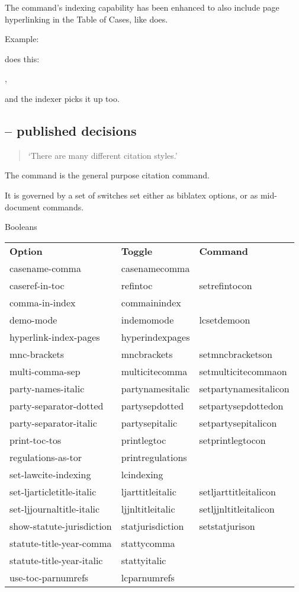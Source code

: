 The  command's indexing capability has been enhanced to also include page hyperlinking in the Table of Cases, like  does.

Example:

\bigskip

\setpartysepitalicoff
{} does this: 

, 

and the indexer picks it up too.

\subsection{ -- published decisions}
\begin{quotation}
`There are many different citation styles.' 
\medskip

\end{quotation}

The  command is the general purpose citation command.

It is governed by a set of switches set either as biblatex options, or as mid-document commands.
\bigskip

Booleans

\begin{tabular}{lll}
\bfseries Option & \bfseries Toggle & \bfseries Command \\ 
casename-comma & casenamecomma &  \\ 
caseref-in-toc & refintoc & setrefintocon \\ 
comma-in-index & commainindex &  \\ 
demo-mode & indemomode & lcsetdemoon \\ 
hyperlink-index-pages & hyperindexpages &  \\ 
mnc-brackets & mncbrackets & setmncbracketson \\ 
multi-comma-sep & multicitecomma & setmulticitecommaon \\ 
party-names-italic & partynamesitalic & setpartynamesitalicon \\ 
party-separator-dotted & partysepdotted & setpartysepdottedon \\ 
party-separator-italic & partysepitalic & setpartysepitalicon \\ 
print-toc-tos & printlegtoc & setprintlegtocon \\ 
regulations-as-tor & printregulations &  \\ 
set-lawcite-indexing & lcindexing &  \\ 
set-ljarticletitle-italic & ljarttitleitalic & setljarttitleitalicon \\ 
set-ljjournaltitle-italic & ljjnltitleitalic & setljjnltitleitalicon \\ 
show-statute-jurisdiction & statjurisdiction & setstatjurison \\ 
statute-title-year-comma & stattycomma &  \\ 
statute-title-year-italic & stattyitalic &  \\ 
use-toc-parnumrefs & lcparnumrefs &  \\ 
\end{tabular}

